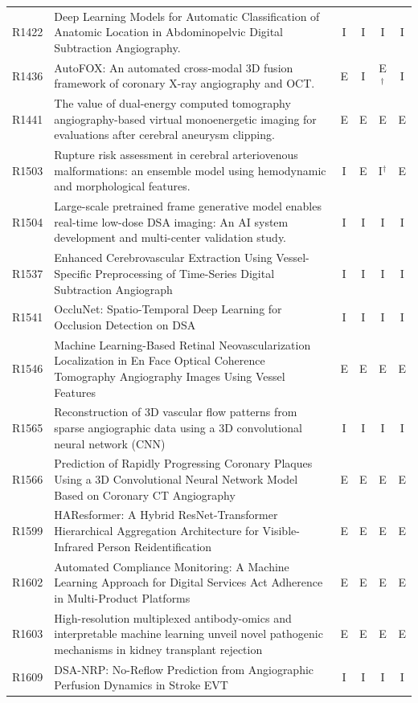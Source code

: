 \begin{longtable}{@{}l p{8.6cm} c c c c@{}}
R1422 & Deep Learning Models for Automatic Classification of Anatomic Location in Abdominopelvic Digital Subtraction Angiography. & I & I & I & I \\
R1436 & AutoFOX: An automated cross-modal 3D fusion framework of coronary X-ray angiography and OCT. & E & I & E$^{\dagger}$ & I \\
R1441 & The value of dual-energy computed tomography angiography-based virtual monoenergetic imaging for evaluations after cerebral aneurysm clipping. & E & E & E & E \\
R1503 & Rupture risk assessment in cerebral arteriovenous malformations: an ensemble model using hemodynamic and morphological features. & I & E & I$^{\dagger}$ & E \\
R1504 & Large-scale pretrained frame generative model enables real-time low-dose DSA imaging: An AI system development and multi-center validation study. & I & I & I & I \\
R1537 & Enhanced Cerebrovascular Extraction Using Vessel-Specific Preprocessing of Time-Series Digital Subtraction Angiograph & I & I & I & I \\
R1541 & OccluNet: Spatio-Temporal Deep Learning for Occlusion Detection on DSA & I & I & I & I \\
R1546 & Machine Learning-Based Retinal Neovascularization Localization in En Face Optical Coherence Tomography Angiography Images Using Vessel Features & E & E & E & E \\
R1565 & Reconstruction of 3D vascular flow patterns from sparse angiographic data using a 3D convolutional neural network (CNN) & I & I & I & I \\
R1566 & Prediction of Rapidly Progressing Coronary Plaques Using a 3D Convolutional Neural Network Model Based on Coronary CT Angiography & E & E & E & E \\
R1599 & HAResformer: A Hybrid ResNet-Transformer Hierarchical Aggregation Architecture for Visible-Infrared Person Reidentification & E & E & E & E \\
R1602 & Automated Compliance Monitoring: A Machine Learning Approach for Digital Services Act Adherence in Multi-Product Platforms & E & E & E & E \\
R1603 & High-resolution multiplexed antibody-omics and interpretable machine learning unveil novel pathogenic mechanisms in kidney transplant rejection & E & E & E & E \\
R1609 & DSA-NRP: No-Reflow Prediction from Angiographic Perfusion Dynamics in Stroke EVT & I & I & I & I \\

\end{longtable}
